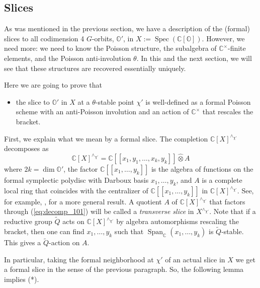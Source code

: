 \documentclass[12pt]{amsart}
\newcommand{\C}{\mathbb{C}}
\newcommand{\Orb}{\mathbb{O}}
\newcommand{\cm}{\C^\times}
\theoremstyle{definition}
\numberwithin{equation}{section}
\begin{document}
\subsection{Slices}
As was mentioned in the previous section, we have a description of the (formal) slices to all codimension 4 $G$-orbits, $\Orb'$, in
$X:=\operatorname{Spec}(\C[\Orb])$. However, we need more: we need to know the Poisson structure, the subalgebra of $\C^\times$-finite elements,
and the Poisson anti-involution $\theta$. In this and the next section, we will see that these structures
are recovered essentially uniquely.

Here we are going to prove that
\begin{itemize}
\item[(*)]
the slice to $\Orb'$ in $X$ at a $\theta$-stable
point $\chi'$ is well-defined as a formal Poisson scheme with an anti-Poisson involution
and an action of $\C^\times$ that rescales the bracket.
\end{itemize}

First, we explain what we mean by a formal slice. The completion $\C[X]^{\wedge_{\chi'}}$ decomposes as
\begin{equation}\label{eq:decomp_101}\C[X]^{\wedge_{\chi'}}=\C[[x_1,y_1,\ldots,x_k,y_k]]\widehat{\otimes}
A\end{equation}
where $2k=\dim \Orb'$, the factor $\C[[x_1,\ldots,y_k]]$ is the algebra of functions on the formal
symplectic polydisc with Darboux basis $x_1,\ldots,y_k$, and $A$ is a complete local ring that coincides
with the centralizer of $\C[[x_1,\ldots,y_k]]$ in $\C[X]^{\wedge_{\chi'}}$. See, for example, \cite[Theorem 2.3]{Kaledin_symplectic}, for a more general result. A quotient $A$ of $\C[X]^{\wedge_{\chi'}}$ that factors through (\ref{eq:decomp_101}) will be called a {\it transverse slice} in $X^{\wedge_{\chi'}}$. Note that if a reductive group $\tilde{Q}$ acts on
$\C[X]^{\wedge_{\chi'}}$ by algebra automorphisms rescaling the bracket,
then one can find $x_1,\ldots,y_k$
such that $\operatorname{Span}_{\C}(x_1,\ldots,y_k)$ is $\tilde{Q}$-stable.
This gives a $\tilde{Q}$-action on $A$.

In particular, taking the formal neighborhood at $\chi'$ of an actual slice in $X$ we get a formal slice in the sense of the 
previous paragraph. So, the following lemma implies (*). 
\end{document}
